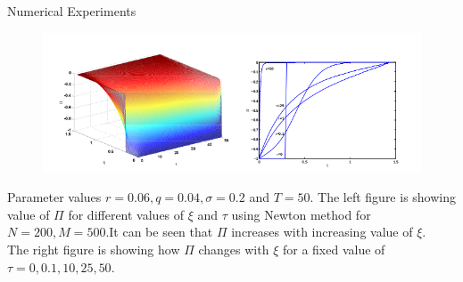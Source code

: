 \documentclass{beamer}
\begin{document}
\begin{frame}{Numerical Experiments}
    
\begin{figure}[!htb]
	\centering 
	\includegraphics[width=0.7\linewidth]{image2.png}

\end{figure}
Parameter values $r=0.06,q=0.04,\sigma=0.2$ and $T=50$.
The left figure is showing value of $\Pi$ for different values of $\xi$ and $\tau$ using Newton method for $N=200,M=500$.It can be seen that $\Pi$ increases with increasing value of $\xi$.\\
The right figure is showing how $\Pi$ changes with $\xi$ for a fixed value of $\tau=0,0.1,10,25,50$.

\end{frame}
\end{document}
